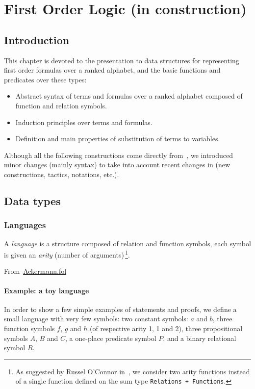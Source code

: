 \chapter{First Order Logic (in construction)}
\label{chap:fol}

\section{Introduction}

This chapter is devoted to the presentation to  data structures for representing first order formulas over a ranked alphabet, and the basic functions and predicates over these types:

\begin{itemize}
\item Abstract syntax of terms and formulas over a ranked alphabet composed of function and relation symbols.
\item Induction principles over terms and formulas.
\item Definition and main properties of substitution of terms to variables.
\end{itemize}




Although all the following constructions come directly from~\cite{Goedel}, we introduced minor changes (mainly syntax) to
take into account recent changes in \coq(new constructions, tactics, notations, etc.).


\section{Data types}

\subsection{Languages}

A \emph{language} is a structure composed of relation and function symbols, each symbol is given an \emph{arity} (number of arguments)\,\footnote{As suggested by Russel O'Connor in~\cite{OConnor05}, we consider two arity functions instead of a single function defined on the sum type \texttt{Relations + Functions}.}.

From~\href{../theories/html/hydras.Ackermann.fol.html}{Ackermann.fol}


\subsubsection{Example: a toy language}
In order to show a few simple examples of statements and proofs, we define a small language with very few symbols:
two constant symbols: $a$ and $b$, three function symbols $f$, $g$ and $h$  (of respective arity 1, 1 and 2), three propositional symbols $A$, $B$ and $C$, a one-place predicate symbol $P$, and a binary relational symbol $R$. 
 
